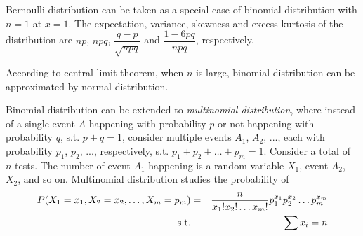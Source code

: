 Bernoulli distribution can be taken as a special case of binomial distribution with $n=1$ at $x=1$. The expectation, variance, skewness and excess kurtosis of the distribution are $np$, $npq$, $\dfrac{q-p}{\sqrt{npq}}$ and $\dfrac{1-6pq}{npq}$, respectively.

According to central limit theorem, when $n$ is large, binomial distribution can be approximated by normal distribution.

Binomial distribution can be extended to \textit{multinomial distribution}, where instead of a single event $A$ happening with probability $p$ or not happening with probability $q$, s.t. $p+q=1$, consider multiple events $A_1$, $A_2$, ..., each with probability $p_1$, $p_2$, ..., respectively, s.t. $p_1+p_2+\ldots+p_m=1$. Consider a total of $n$ tests. The number of event $A_1$ happening is a random variable $X_1$, event $A_2$, $X_2$, and so on. Multinomial distribution studies the probability of
\begin{eqnarray}
  P(X_1=x_1, X_2=x_2,\ldots, X_m = p_m) &=& \dfrac{n}{x_1!x_2!\ldots x_m!}p_1^{x_1}p_2^{x_2}\ldots p_m^{x_m} \nonumber \\
  \textup{s.t.} && \sum x_i = n \nonumber
\end{eqnarray}

